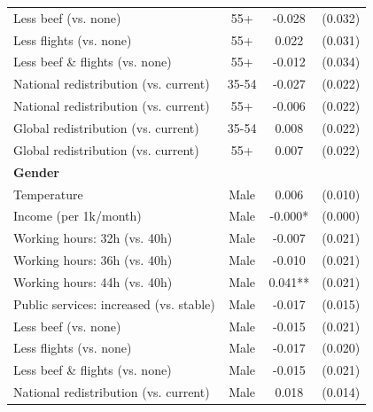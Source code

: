\begin{table}[H]
\begin{tabular}{ l c c c }
\hspace{0.05cm} Less beef (vs. none) & 55+ & -0.028 & (0.032) \\
\hspace{0.05cm} Less flights (vs. none) & 55+ & 0.022 & (0.031) \\
\hspace{0.05cm} Less beef \& flights (vs. none) & 55+ & -0.012 & (0.034) \\
\hspace{0.05cm} National redistribution (vs. current) & 35-54 & -0.027 & (0.022) \\
\hspace{0.05cm} National redistribution (vs. current) & 55+ & -0.006 & (0.022) \\
\hspace{0.05cm} Global redistribution (vs. current) & 35-54 & 0.008 & (0.022) \\
\hspace{0.05cm} Global redistribution (vs. current) & 55+ & 0.007 & (0.022) \\
\hline
\multicolumn{4}{l}{\textbf{Gender}} \\
\hspace{0.05cm} Temperature & Male & 0.006 & (0.010) \\
\hspace{0.05cm} Income (per 1k/month) & Male & -0.000* & (0.000) \\
\hspace{0.05cm} Working hours: 32h (vs. 40h) & Male & -0.007 & (0.021) \\
\hspace{0.05cm} Working hours: 36h (vs. 40h) & Male & -0.010 & (0.021) \\
\hspace{0.05cm} Working hours: 44h (vs. 40h) & Male & 0.041** & (0.021) \\
\hspace{0.05cm} Public services: increased (vs. stable) & Male & -0.017 & (0.015) \\
\hspace{0.05cm} Less beef (vs. none) & Male & -0.015 & (0.021) \\
\hspace{0.05cm} Less flights (vs. none) & Male & -0.017 & (0.020) \\
\hspace{0.05cm} Less beef \& flights (vs. none) & Male & -0.015 & (0.021) \\
\hspace{0.05cm} National redistribution (vs. current) & Male & 0.018 & (0.014) \\

\end{tabular}
\end{table}
